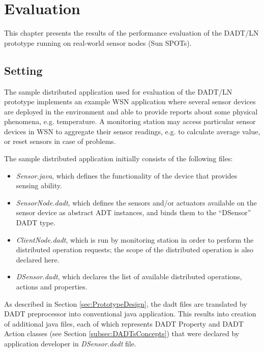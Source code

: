 \chapter{Evaluation} \label{chap:evaluation}

This chapter presents the results of the performance evaluation of the 
DADT/LN prototype running on real-world sensor nodes (Sun SPOTs). 

\section{Setting}


The sample distributed application used for evaluation of the DADT/LN prototype 
implements an example WSN application where several sensor devices are deployed
in the environment and able to provide reports about some physical
phenomena, e.g. temperature. A monitoring station may access
particular sensor devices in WSN to aggregate their sensor readings, e.g. to
calculate average value, or reset sensors in case of problems.

The sample distributed application initially consists of the following files:
\begin{itemize}
  \item \emph{Sensor.java}, which defines the functionality of the device
  that provides sensing ability.
  \item \emph{SensorNode.dadt}, which defines the sensors and/or actuators available on the sensor
  device as abstract ADT instances, and binds them to the ``DSensor''  DADT type.
  \item \emph{ClientNode.dadt}, which is run by monitoring station
  in order to perform the distributed operation requests; the scope
  of the distributed operation is also declared here.
  \item \emph{DSensor.dadt}, which declares the list of available
  distributed operations, actions and properties.
\end{itemize}

As described in Section \ref{sec:PrototypeDesign}, the dadt files are translated
by DADT preprocessor into conventional java application. This
results into creation of additional java files, each of which represents DADT
Property and DADT Action classes (see Section \ref{subsec:DADTsConcepts}) that
were declared by application developer in \emph{DSensor.dadt} file. 


